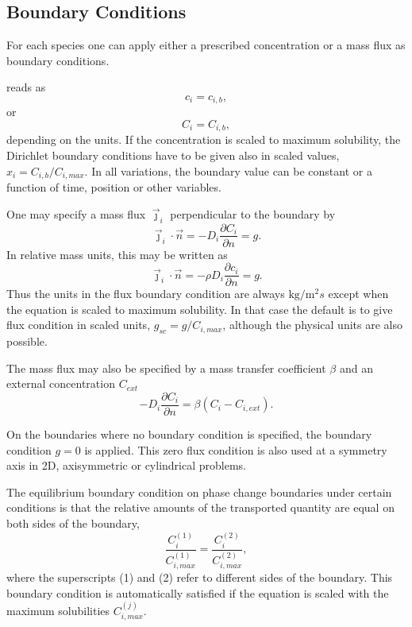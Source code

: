 \begin{versiona}
\subsection{Boundary Conditions}

For each species one can apply either a prescribed concentration or a mass
flux as boundary conditions.

 reads as
\begin{equation}
c_i=c_{i,b},
\end{equation}
or
\begin{equation}
C_i=C_{i,b},
\end{equation}
depending on the units. If the concentration is scaled to maximum
solubility, the Dirichlet boundary conditions have to be given also in
scaled values, $x_i = C_{i,b}/C_{i,max}$. In all variations, the
boundary value can be constant or a function of time, position or
other variables.

One may specify a mass flux $\vec{\jmath}_i$ perpendicular to the boundary by
\begin{equation}
\vec{\jmath}_i\cdot\vec{n} = -D_i\frac{\partial C_i}{\partial n} = g.
\end{equation}
In relative mass units, this may be written as
\begin{equation}
\vec{\jmath}_i\cdot\vec{n} = -\rho D_i\frac{\partial c_i}{\partial n} = g.
\end{equation}
Thus the units in the flux boundary condition are always
$\mathrm{kg}/\mathrm{m}^2s$ except when the equation is scaled to
maximum solubility. In that case the default is to give flux condition
in scaled units, $g_{sc} = g/C_{i,max}$, although the physical
units are also possible.

The mass flux may also be specified by a mass transfer coefficient
$\beta$ and an external concentration $C_{ext}$
\begin{equation}
-D_i\frac{\partial C_i}{\partial n} = \beta(C_i-C_{i,ext}).
\end{equation}

On the boundaries where no boundary condition is specified, the
boundary condition $g=0$ is applied. This zero flux
condition is also used at a symmetry axis in 2D, axisymmetric or
cylindrical problems.

The equilibrium boundary condition on phase change boundaries under
certain conditions is that the relative amounts of the transported
quantity are equal on both sides of the boundary, 
\begin{equation}
\frac{C_i^{(1)}}{C^{(1)}_{i,max}} = \frac{C_i^{(2)}}{C^{(2)}_{i,max}},
\end{equation}
where the superscripts (1) and (2) refer to different sides of the
boundary. This boundary condition is automatically satisfied if the
equation is scaled with the maximum solubilities $C^{(j)}_{i,max}$.


\end{versiona}

